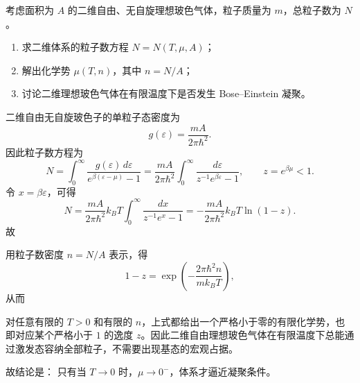 \begin{question}
考虑面积为 $A$ 的二维自由、无自旋理想玻色气体，粒子质量为 $m$，总粒子数为 $N$。

\begin{enumerate}[label=(\arabic*),leftmargin=2.5em]
  \item 求二维体系的粒子数方程 $N=N(T,\mu,A)$；
  \item 解出化学势 $\mu(T,n)$，其中 $n=N/A$；
  \item 讨论二维理想玻色气体在有限温度下是否发生 Bose--Einstein 凝聚。
\end{enumerate}

\begin{solution}
二维自由无自旋玻色子的单粒子态密度为
\[
g(\varepsilon)=\frac{mA}{2\pi\hbar^2}.
\]
因此粒子数方程为
\[
N=\int_0^\infty \frac{g(\varepsilon)\,d\varepsilon}{e^{\beta(\varepsilon-\mu)}-1}
=\frac{mA}{2\pi\hbar^2}\int_0^\infty \frac{d\varepsilon}{z^{-1}e^{\beta\varepsilon}-1},
\qquad z=e^{\beta\mu}<1.
\]
令 $x=\beta\varepsilon$，可得
\[
N=\frac{mA}{2\pi\hbar^2}k_B T\int_0^\infty \frac{dx}{z^{-1}e^x-1}
= -\frac{mA}{2\pi\hbar^2}k_B T\ln(1-z).
\]
故

用粒子数密度 $n=N/A$ 表示，得
\[
1-z=\exp\left(-\frac{2\pi\hbar^2 n}{m k_B T}\right),
\]
从而

对任意有限的 $T>0$ 和有限的 $n$，上式都给出一个严格小于零的有限化学势，也即对应某个严格小于 $1$ 的逸度 $z$。因此二维自由理想玻色气体在有限温度下总能通过激发态容纳全部粒子，不需要出现基态的宏观占据。

故结论是：
只有当 $T\to 0$ 时，$\mu\to 0^{-}$，体系才逼近凝聚条件。
\end{solution}
\end{question}

